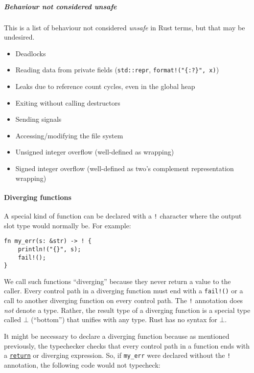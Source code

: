 \documentclass[]{article}
\begin{document}
\subparagraph{Behaviour not considered
unsafe}\label{behaviour-not-considered-unsafe}

This is a list of behaviour not considered \emph{unsafe} in Rust terms,
but that may be undesired.

\begin{itemize}
\itemsep1pt\parskip0pt
\item
  Deadlocks
\item
  Reading data from private fields (\texttt{std::repr},
  \texttt{format!("\{:?\}", x)})
\item
  Leaks due to reference count cycles, even in the global heap
\item
  Exiting without calling destructors
\item
  Sending signals
\item
  Accessing/modifying the file system
\item
  Unsigned integer overflow (well-defined as wrapping)
\item
  Signed integer overflow (well-defined as two's complement
  representation wrapping)
\end{itemize}

\paragraph{Diverging functions}\label{diverging-functions}

A special kind of function can be declared with a \texttt{!} character
where the output slot type would normally be. For example:

\begin{verbatim}
fn my_err(s: &str) -> ! {
    println!("{}", s);
    fail!();
}
\end{verbatim}

We call such functions ``diverging'' because they never return a value
to the caller. Every control path in a diverging function must end with
a \texttt{fail!()} or a call to another diverging function on every
control path. The \texttt{!} annotation does \emph{not} denote a type.
Rather, the result type of a diverging function is a special type called
$\bot$ (``bottom'') that unifies with any type. Rust has no syntax for
$\bot$.

It might be necessary to declare a diverging function because as
mentioned previously, the typechecker checks that every control path in
a function ends with a \hyperref[return-expressions]{\texttt{return}} or
diverging expression. So, if \texttt{my\_err} were declared without the
\texttt{!} annotation, the following code would not typecheck:
\end{document}
